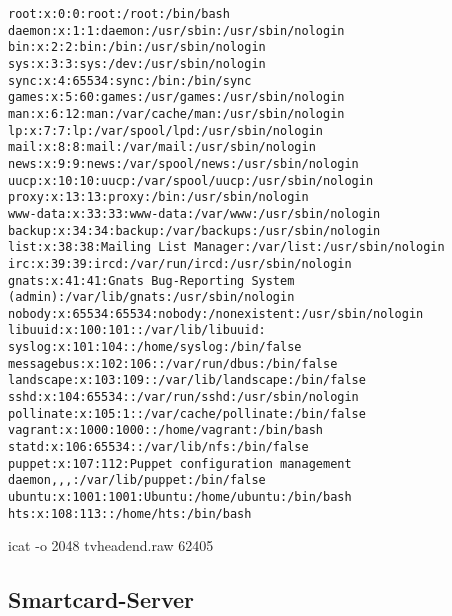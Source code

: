 \begin{cmd}[H]
\begin{verbatim}
root:x:0:0:root:/root:/bin/bash
daemon:x:1:1:daemon:/usr/sbin:/usr/sbin/nologin
bin:x:2:2:bin:/bin:/usr/sbin/nologin
sys:x:3:3:sys:/dev:/usr/sbin/nologin
sync:x:4:65534:sync:/bin:/bin/sync
games:x:5:60:games:/usr/games:/usr/sbin/nologin
man:x:6:12:man:/var/cache/man:/usr/sbin/nologin
lp:x:7:7:lp:/var/spool/lpd:/usr/sbin/nologin
mail:x:8:8:mail:/var/mail:/usr/sbin/nologin
news:x:9:9:news:/var/spool/news:/usr/sbin/nologin
uucp:x:10:10:uucp:/var/spool/uucp:/usr/sbin/nologin
proxy:x:13:13:proxy:/bin:/usr/sbin/nologin
www-data:x:33:33:www-data:/var/www:/usr/sbin/nologin
backup:x:34:34:backup:/var/backups:/usr/sbin/nologin
list:x:38:38:Mailing List Manager:/var/list:/usr/sbin/nologin
irc:x:39:39:ircd:/var/run/ircd:/usr/sbin/nologin
gnats:x:41:41:Gnats Bug-Reporting System (admin):/var/lib/gnats:/usr/sbin/nologin
nobody:x:65534:65534:nobody:/nonexistent:/usr/sbin/nologin
libuuid:x:100:101::/var/lib/libuuid:
syslog:x:101:104::/home/syslog:/bin/false
messagebus:x:102:106::/var/run/dbus:/bin/false
landscape:x:103:109::/var/lib/landscape:/bin/false
sshd:x:104:65534::/var/run/sshd:/usr/sbin/nologin
pollinate:x:105:1::/var/cache/pollinate:/bin/false
vagrant:x:1000:1000::/home/vagrant:/bin/bash
statd:x:106:65534::/var/lib/nfs:/bin/false
puppet:x:107:112:Puppet configuration management daemon,,,:/var/lib/puppet:/bin/false
ubuntu:x:1001:1001:Ubuntu:/home/ubuntu:/bin/bash
hts:x:108:113::/home/hts:/bin/bash
\end{verbatim}
\caption{icat -o 2048 tvheadend.raw 62405}
\label{cmd:tvheadend-passwd}
\end{cmd}

\subsection{Smartcard-Server}
